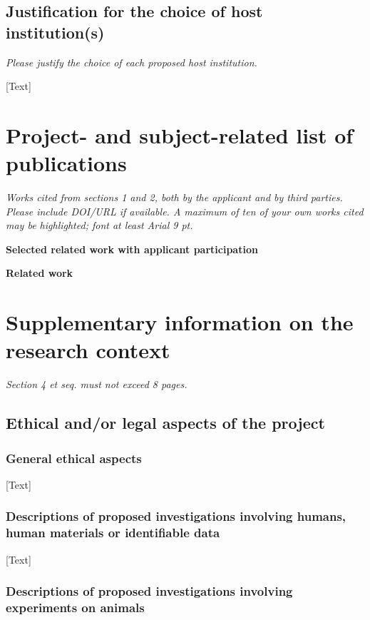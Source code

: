 \documentclass[11pt]{article} %
\begin{document}
\subsection{Justification for the choice of host institution(s)}
\textit{Please justify the choice of each proposed host institution.}

[Text]


\section{ Project- and subject-related list of publications }
\textit{ Works cited from sections 1 and 2, both by the applicant and by third parties. Please include DOI/URL if available. A maximum of ten of your own works cited may be highlighted; font at least Arial 9 pt. }

\renewcommand*{\bibfont}{\normalfont\footnotesize}
\noindent \textbf{Selected related work with applicant participation}
\printbibliography[heading=none,keyword={applicant}]


\noindent \textbf{Related work}
\printbibliography[heading=none,notkeyword={applicant}]


\newpage

\section{ Supplementary information on the research context }
\textit{Section 4 et seq. must not exceed 8 pages.}

\subsection{ Ethical and/or legal aspects of the project }

\subsubsection{ General ethical aspects }

[Text]

\subsubsection{ Descriptions of proposed investigations involving humans, human materials or identifiable data }

[Text]

\subsubsection{ Descriptions of proposed investigations involving experiments on animals }
\end{document}
